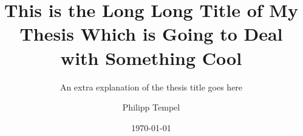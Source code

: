 \documentclass[%
  bachelor,%
  english,%
]{iswstud}
\author{Philipp Tempel}
\date{\today}
\title{This is the Long Long Title of My Thesis Which is Going to Deal with Something Cool}
\subtitle{An extra explanation of the thesis title goes here}
\begin{document}
\maketitle



\begin{otherlanguage}{ngerman}
 \maketitle
\end{otherlanguage}



\begin{abstract}
  \Blindtext[3]
  
\end{abstract}



\begin{otherlanguage}{ngerman}
  \begin{abstract}
    \Blindtext[3]
       
  \end{abstract}
\end{otherlanguage}




\tableofcontents

\listoffigures

\listoftables

\listoftodos






\end{document}
